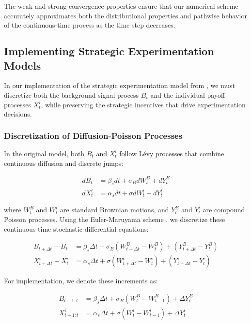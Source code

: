 \documentclass[a4paper,12pt]{report}
\begin{document}
The weak and strong convergence properties ensure that our numerical scheme accurately approximates both the distributional properties and pathwise behavior of the continuous-time process as the time step decreases.

\subsection{Implementing Strategic Experimentation Models}
\label{appendix:strategic_experimentation_implementation}

In our implementation of the strategic experimentation model from \citet{keller2020undiscounted}, we must discretize both the background signal process $B_t$ and the individual payoff processes $X^i_t$, while preserving the strategic incentives that drive experimentation decisions.

\subsubsection{Discretization of Diffusion-Poisson Processes}
\label{appendix:discretization_diffusion_poisson}

In the original model, both $B_t$ and $X^i_t$ follow Lévy processes that combine continuous diffusion and discrete jumps:

\begin{align}
    dB_t   & = \beta_s dt + \sigma_B dW^B_t + dY^B_t \\
    dX^i_t & = \alpha_s dt + \sigma dW^i_t + dY^i_t
\end{align}

where $W^B_t$ and $W^i_t$ are standard Brownian motions, and $Y^B_t$ and $Y^i_t$ are compound Poisson processes. Using the Euler-Maruyama scheme \citep{platen2010numerical}, we discretize these continuous-time stochastic differential equations:

\begin{align}
    B_{t+\Delta t} - B_t     & = \beta_s \Delta t + \sigma_B (W^B_{t+\Delta t} - W^B_t) + (Y^B_{t+\Delta t} - Y^B_t) \\
    X^i_{t+\Delta t} - X^i_t & = \alpha_s \Delta t + \sigma (W^i_{t+\Delta t} - W^i_t) + (Y^i_{t+\Delta t} - Y^i_t)
\end{align}

For implementation, we denote these increments as:

\begin{align}
    B_{t-1:t}   & = \beta_s \Delta t + \sigma_B (W^B_t - W^B_{t-1}) + \Delta Y^B_t \\
    X^i_{t-1:t} & = \alpha_s \Delta t + \sigma (W^i_t - W^i_{t-1}) + \Delta Y^i_t
\end{align}
\end{document}
